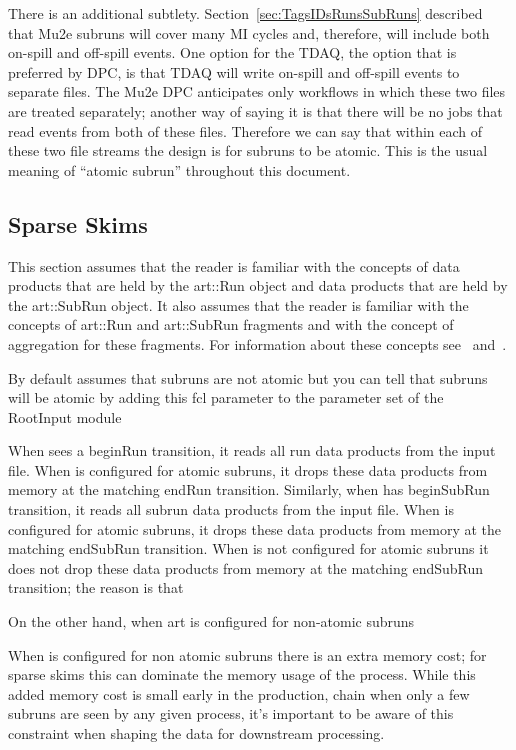 There is an additional subtlety.
Section~\ref{sec:TagsIDsRunsSubRuns} described that Mu2e subruns will cover many MI cycles
and, therefore, will include both on-spill and off-spill events.
One option for the TDAQ, the option that is preferred by DPC,
is that TDAQ will write on-spill and off-spill events to separate files.
The Mu2e DPC anticipates only workflows in which these two files are treated separately;
another way of saying it is that there will be no jobs that read events from both of these files.
Therefore we can say that within each of these two file streams the design is for subruns to be atomic.
This is the usual meaning of ``atomic subrun'' throughout this document.

\subsection{Sparse Skims}

This section assumes that the reader is familiar with the \art concepts
of data products that are held by the {\code art::Run} object
and data products that are held by the {\code art::SubRun} object.
It also assumes that the reader is familiar with the \art concepts
of {\code art::Run} and {\code art::SubRun} fragments
and with the concept of aggregation for these fragments.
For information about these concepts see~\cite{RunAndSubRunProducts}
and~\cite{ProductAggregation}.


By default \art assumes that subruns are not atomic
but you can tell \art that subruns will be atomic by adding this fcl
parameter to the parameter set of the RootInput module


When \art sees a beginRun transition, it reads all run data products from the input file.
When \art is configured for atomic subruns, it drops these data products
from memory at the matching endRun transition.
Similarly, when \art has beginSubRun transition, it reads all subrun data products from the input file.
When \art is configured for atomic subruns, it drops these data products
from memory at the matching endSubRun transition.
When \art is not configured for atomic subruns it does not drop these data products from
memory at the matching endSubRun transition; the reason is that 

On the other hand, when art is configured for non-atomic subruns

When \art is configured for non atomic subruns there is an extra memory cost;
for sparse skims this can dominate the memory usage of the process.
While this added memory cost is small early in the production, chain when
only a few subruns are seen by any given process, it's important to be
aware of this constraint when shaping the data for downstream processing.

